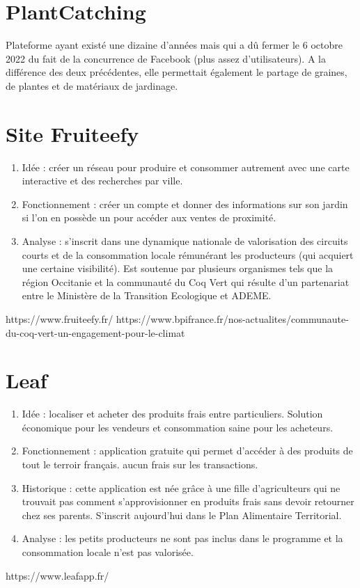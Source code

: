 \documentclass{article}
\begin{document}
\section{PlantCatching} Plateforme ayant existé une dizaine d'années mais
qui a dû fermer le 6 octobre 2022 du fait de la concurrence de Facebook
(plus assez d'utilisateurs). A la différence des deux précédentes, elle
permettait également le partage de graines, de plantes et de matériaux de
jardinage.

\section{Site Fruiteefy}
\begin{enumerate}
    \item Idée : créer un réseau pour produire et consommer autrement
    avec une carte interactive et des recherches par ville.
    \item Fonctionnement : créer un compte et donner des informations sur
    son jardin si l'on en possède un pour accéder aux ventes de proximité. 
    \item Analyse : s'inscrit dans une dynamique nationale de valorisation
    des circuits courts et de la consommation locale rémunérant les
    producteurs (qui acquiert une certaine visibilité). Est soutenue par
    plusieurs organismes tels que la région Occitanie et la communauté du 
    Coq Vert qui résulte d'un partenariat entre le Ministère de la 
    Transition Ecologique et ADEME.
\end{enumerate}
https://www.fruiteefy.fr/
https://www.bpifrance.fr/nos-actualites/communaute-du-coq-vert-un-engagement-pour-le-climat

\section{Leaf}
\begin{enumerate}
    \item Idée : localiser et acheter des produits frais entre particuliers.
    Solution économique pour les vendeurs et consommation saine pour les
    acheteurs.
    \item Fonctionnement : application gratuite qui permet d'accéder à
    des produits de tout le terroir français. aucun frais sur les
    transactions.
    \item Historique : cette application est née grâce à une fille 
    d'agriculteurs qui ne trouvait pas comment s'approvisionner en 
    produits frais sans devoir retourner chez ses parents.
    S'inscrit aujourd'hui dans le Plan Alimentaire Territorial.
    \item Analyse : les petits producteurs ne sont pas inclus dans le 
    programme et la consommation locale n'est pas valorisée.
\end{enumerate}
https://www.leafapp.fr/
\end{document}
